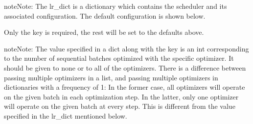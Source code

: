 \documentclass[letterpaper,10pt,english]{sphinxmanual}
\begin{document}
\begin{fulllineitems}
\begin{fulllineitems}
\begin{quote}
\begin{description}
\begin{itemize}
\end{itemize}


\end{description}\end{quote}

\begin{sphinxadmonition}{note}{Note:}
\sphinxAtStartPar
The lr\_dict is a dictionary which contains the scheduler and its associated configuration.
The default configuration is shown below.

\begin{sphinxVerbatim}[commandchars=\\\{\}]
  
      
     
      
      
      
      
\end{sphinxVerbatim}

\sphinxAtStartPar
Only the  key is required, the rest will be set to the defaults above.
\end{sphinxadmonition}

\begin{sphinxadmonition}{note}{Note:}
\sphinxAtStartPar
The  value specified in a dict along with the  key is an int corresponding
to the number of sequential batches optimized with the specific optimizer.
It should be given to none or to all of the optimizers.
There is a difference between passing multiple optimizers in a list,
and passing multiple optimizers in dictionaries with a frequency of 1:
In the former case, all optimizers will operate on the given batch in each optimization step.
In the latter, only one optimizer will operate on the given batch at every step.
This is different from the  value specified in the lr\_dict mentioned below.


\end{sphinxadmonition}
\end{fulllineitems}
\end{fulllineitems}
\end{document}

